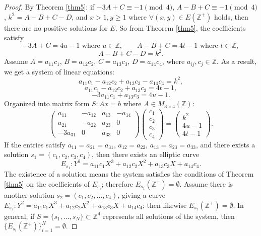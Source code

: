 \documentclass[11pt]{amsart}
\begin{document}
\begin{proof}
By Theorem \ref{thm5}: if $-3A+C\equiv-1\pmod4$, $A-B+C\equiv-1\pmod4$, $k^2=A-B+C-D$, and $x>1,y\ge1$ where $\forall(x,y)\in E(\mathbb{Z}^+)$ holds, then there are no positive solutions for $E$. So from Theorem \ref{thm5}, the coefficients satisfy
\[
-3A+C=4u-1 \text{ where } u\in\mathbb{Z}, \qquad A-B+C=4t-1 \text{ where } t\in\mathbb{Z},
\]
\[
A-B+C-D=k^2.
\]
Assume $A=a_{11}c_1$, $B=a_{12}c_2$, $C=a_{13}c_3$, $D=a_{14}c_4$, where $a_{ij},c_j\in\mathbb{Z}$. As a result, we get a system of linear equations:
\[
a_{11}c_1-a_{12}c_2+a_{13}c_3-a_{14}c_4=k^2,
\]
\[
a_{11}c_1-a_{12}c_2+a_{13}c_3=4t-1,
\]
\[
-3a_{11}c_1+a_{13}c_3=4u-1.
\]
Organized into matrix form $S: Ax=b$ where $A\in M_{3\times4}(\mathbb{Z})$:
\[
\begin{pmatrix}
a_{11}&-a_{12}&a_{13}&-a_{14}\\
a_{21}&-a_{22}&a_{23}&0\\
-3a_{31}&0&a_{33}&0
\end{pmatrix}
\begin{pmatrix}c_1\\c_2\\c_3\\c_4\end{pmatrix}
=\begin{pmatrix}k^2\\4u-1\\4t-1\end{pmatrix}.
\]
If the entries satisfy $a_{11}=a_{21}=a_{31}$, $a_{12}=a_{22}$, $a_{13}=a_{23}=a_{33}$, and there exists a solution $s_1=(c_1,c_2,c_3,c_4)$, then there exists an elliptic curve
\[
E_{s_1}: Y^2=a_{11}c_1X^3+a_{12}c_2X^2+a_{13}c_3X+a_{14}c_4.
\]
The existence of a solution means the system satisfies the conditions of Theorem \ref{thm5} on the coefficients of $E_{s_i}$; therefore $E_{s_1}(\mathbb{Z}^+)=\emptyset$. Assume there is another solution $s_2=(c_1,c_2,\dots,c_4)$, giving a curve $E_{s_2}: Y^2=a_{11}c_1X^3+a_{12}c_2X^2+a_{13}c_3X+a_{14}c_4$; then likewise $E_{s_2}(\mathbb{Z}^+)=\emptyset$. In general, if $S=\{s_1,\dots,s_N\}\subset\mathbb{Z}^4$ represents all solutions of the system, then $\{E_{s_i}(\mathbb{Z}^+)\}_{i=1}^N=\emptyset$. \qedhere
\end{proof}
\end{document}
